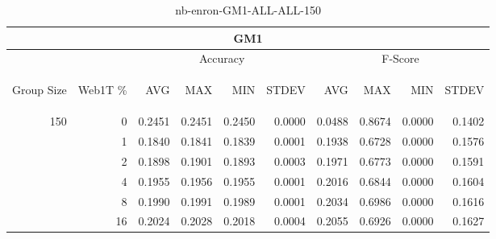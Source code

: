\begin{center}
\begin{table}[htbp]
\begin{tabular}{ | r | r | r | r | r | r | r | r | r | r |}
\hline
\multicolumn{10}{|c|}{GM1}\\
\hline
 & & \multicolumn{4}{|c|}{Accuracy} & \multicolumn{4}{|c|}{F-Score}\\ \cline{3-10}
\begin{sideways}Group Size\end{sideways} & \begin{sideways}Web1T \%\end{sideways} & \begin{sideways}AVG\end{sideways} & \begin{sideways}MAX\end{sideways} & \begin{sideways}MIN\end{sideways} & \begin{sideways}STDEV\end{sideways} & \begin{sideways}AVG\end{sideways} & \begin{sideways}MAX\end{sideways} & \begin{sideways}MIN\end{sideways} & \begin{sideways}STDEV\end{sideways}\\
\hline
\multirow{6}{*}{150}
 & 0 & 0.2451 & 0.2451 & 0.2450 & 0.0000 & 0.0488 & 0.8674 & 0.0000 & 0.1402\\ \cline{2-10}
 & 1 & 0.1840 & 0.1841 & 0.1839 & 0.0001 & 0.1938 & 0.6728 & 0.0000 & 0.1576\\ \cline{2-10}
 & 2 & 0.1898 & 0.1901 & 0.1893 & 0.0003 & 0.1971 & 0.6773 & 0.0000 & 0.1591\\ \cline{2-10}
 & 4 & 0.1955 & 0.1956 & 0.1955 & 0.0001 & 0.2016 & 0.6844 & 0.0000 & 0.1604\\ \cline{2-10}
 & 8 & 0.1990 & 0.1991 & 0.1989 & 0.0001 & 0.2034 & 0.6986 & 0.0000 & 0.1616\\ \cline{2-10}
 & 16 & 0.2024 & 0.2028 & 0.2018 & 0.0004 & 0.2055 & 0.6926 & 0.0000 & 0.1627\\ \cline{2-10}
\hline
\end{tabular}
\caption{nb-enron-GM1-ALL-ALL-150}
\end{table}
\end{center}

